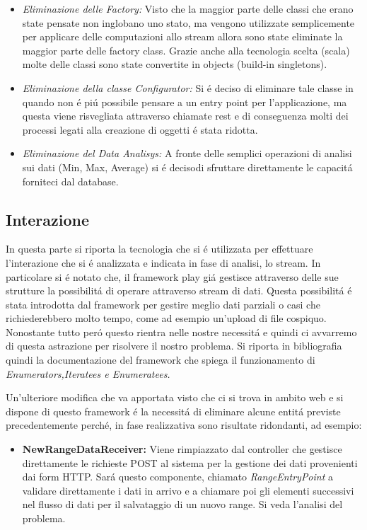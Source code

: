 \begin{itemize}
  \item \textit{Eliminazione delle Factory:} Visto che la maggior parte delle classi che erano state pensate non inglobano uno stato, ma vengono utilizzate semplicemente per applicare delle computazioni allo stream allora sono state eliminate la maggior parte delle factory class. Grazie anche alla tecnologia scelta (scala) molte delle classi sono state convertite in objects (build-in singletons).
  \item \textit{Eliminazione della classe Configurator:} Si \'e deciso di eliminare tale classe in quando non \'e pi\'u possibile pensare a un entry point per l'applicazione, ma questa viene risvegliata attraverso chiamate rest e di conseguenza molti dei processi legati alla creazione di oggetti \'e stata ridotta.
  \item \textit{Eliminazione del Data Analisys:} A fronte delle semplici operazioni di analisi sui dati (Min, Max, Average) si \'e decisodi sfruttare direttamente le capacit\'a forniteci dal database.
\end{itemize}

\subsection{Interazione}

In questa parte si riporta la tecnologia che si \'e utilizzata per effettuare l'interazione che si \'e analizzata e indicata in fase di analisi, lo stream. In particolare si \'e notato che, il framework play\cite{PlayFramework} gi\'a gestisce attraverso delle sue strutture la possibilit\'a di operare attraverso stream di dati. Questa possibilit\'a \'e stata introdotta dal framework per gestire meglio dati parziali o casi che richiederebbero molto tempo, come ad esempio un'upload di file cospiquo. Nonostante tutto per\'o questo rientra nelle nostre necessit\'a e quindi ci avvarremo di questa astrazione per risolvere il nostro problema. Si riporta in bibliografia quindi la documentazione del framework che spiega il funzionamento di \textit{Enumerators,Iteratees e Enumeratees.} \cite{PlayStreaming}

Un'ulteriore modifica che va apportata visto che ci si trova in ambito web e si dispone di questo framework \'e la necessit\'a di eliminare alcune entit\'a previste precedentemente perch\'e, in fase realizzativa sono risultate ridondanti, ad esempio:
\begin{itemize}
\item \textbf{NewRangeDataReceiver:} Viene rimpiazzato dal controller che gestisce direttamente le richieste POST al sistema per la gestione dei dati provenienti dai form HTTP. Sar\'a questo componente, chiamato \textit{RangeEntryPoint} a validare direttamente i dati in arrivo e a chiamare poi gli elementi successivi nel flusso di dati per il salvataggio di un nuovo range. Si veda l'analisi del problema.
\end{itemize}


